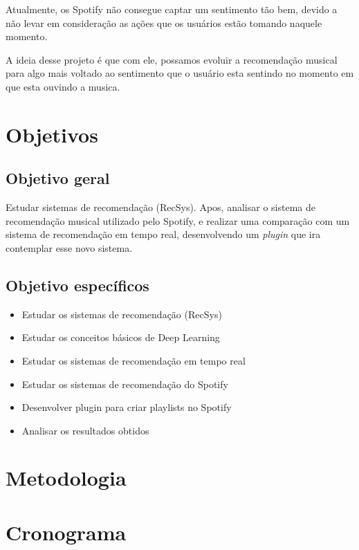\documentclass{article}
\begin{document}
Atualmente, os Spotify não consegue captar um sentimento tão bem, devido a não levar em consideração as ações que os usuários estão tomando naquele momento. 

A ideia desse projeto é que com ele, possamos evoluir a recomendação musical para algo mais voltado ao sentimento que o usuário esta sentindo no momento em que esta ouvindo a musica.

\newpage

\section{Objetivos}

\subsection{Objetivo geral}

Estudar sistemas de recomendação (RecSys). Apos, analisar o sistema de recomendação musical utilizado pelo Spotify, e realizar uma comparação com um sistema de recomendação em tempo real, desenvolvendo um \textit{plugin} que ira contemplar esse novo sistema.

\subsection{Objetivo específicos}

\begin{itemize}
\item Estudar os sistemas de recomendação (RecSys)
\item Estudar os conceitos básicos de Deep Learning
\item Estudar os sistemas de recomendação em tempo real
\item Estudar os sistemas de recomendação do Spotify
\item Desenvolver plugin para criar playlists no Spotify
\item Analisar os resultados obtidos
\end{itemize}

\newpage

\section{Metodologia}

\newpage

\section{Cronograma}

\newpage

% 


\end{document}
